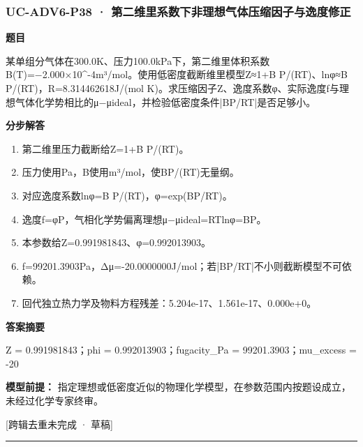 \documentclass[UTF8,11pt,a4paper]{ctexart}
\begin{document}
\subsubsection*{UC-ADV6-P38 · 第二维里系数下非理想气体压缩因子与逸度修正}
\noindent\textbf{题目}\par
某单组分气体在300.0K、压力100.0kPa下，第二维里体积系数B(T)=−2.000×10\textasciicircum{}-4m³/mol。使用低密度截断维里模型Z≈1+B P/(RT)、lnφ≈B P/(RT)，R=8.314462618J/(mol K)。求压缩因子Z、逸度系数φ、实际逸度f与理想气体化学势相比的μ−μideal，并检验低密度条件|BP/RT|是否足够小。\par
\medskip\noindent\textbf{分步解答}
\begin{enumerate}
\item 第二维里压力截断给Z=1+B P/(RT)。
\item 压力使用Pa，B使用m³/mol，使BP/(RT)无量纲。
\item 对应逸度系数lnφ=B P/(RT)，φ=exp(BP/RT)。
\item 逸度f=φP，气相化学势偏离理想μ−μideal=RTlnφ=BP。
\item 本参数给Z=0.991981843、φ=0.992013903。
\item f=99201.3903Pa，Δμ=-20.0000000J/mol；若|BP/RT|不小则截断模型不可依赖。
\item 回代独立热力学及物料方程残差：5.204e-17、1.561e-17、0.000e+0。
\end{enumerate}
\noindent\textbf{答案摘要}\par
Z = 0.991981843；phi = 0.992013903；fugacity\_Pa = 99201.3903；mu\_excess = -20\par
\noindent\textbf{模型前提：}
指定理想或低密度近似的物理化学模型，在参数范围内按题设成立，未经过化学专家终审。\par
\noindent\textcolor{red!65!black}{[跨辑去重未完成 · 草稿]} \par
\medskip\hrule\medskip
{}
\end{document}
